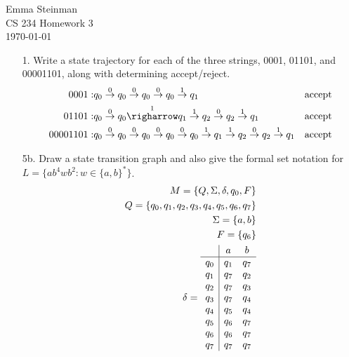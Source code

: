 \documentclass[11pt]{article} %
\begin{document}
\begin{raggedleft}   %
Emma Steinman\\      %
CS 234 Homework 3\\
\today\\
\end{raggedleft}

\begin{enumerate}
\item[1.] Write a state trajectory for each of the three strings, 0001, 01101, and 00001101, along with determining accept/reject.
\begin{eqnarray*}0001: & q_0 \overset{0}{\rightarrow} q_0 \overset{0}{\rightarrow} q_0 \overset{0}{\rightarrow} q_0 \overset{1}{\rightarrow} q_1 & \textrm{accept} \\ 01101: & q_0 \overset{0}{\rightarrow} q_0 \overset{1}{\righarrow} q_1 \overset{1}{\rightarrow} q_2 \overset{0}{\rightarrow} q_2 \overset{1}{\rightarrow} q_1 & \textrm{accept} \\ 00001101: & q_0 \overset{0}{\rightarrow} q_0 \overset{0}{\rightarrow} q_0 \overset{0}{\rightarrow} q_0 \overset{0}{\rightarrow} q_0 \overset{1}{\rightarrow} q_1 \overset{1}{\rightarrow} q_2 \overset{0}{\rightarrow} q_2 \overset{1}{\rightarrow} q_1 &\textrm{accept} \\
\end{eqnarray*}
\item[5b.] Draw a state transition graph and also give the formal set notation for\\ $L=\{ab^{4}wb^{2}:w\in \{a,b\}^{*}\}$.
\begin{eqnarray*} 
M= \{Q, \Sigma, \delta, q_0, F\} \\ Q = \{q_0, q_1, q_2, q_3, q_4, q_5, q_6, q_7\}\\ \Sigma = \{a,b\}\\
F = \{q_6\} \\ \delta = \begin{array}{c | c c} & a & b\\ \hline q_0 & q_1 & q_7 \\ q_1 & q_7 & q_2 \\ q_2 & q_7 & q_3 \\ q_3 & q_7 & q_4 \\ q_4 & q_5 & q_4 \\ q_5 & q_6 & q_7 \\ q_6 & q_6 & q_7 \\ q_7 & q_7 & q_7 \end{array}\\

\end{eqnarray*}
\end{enumerate}
\end{document}

